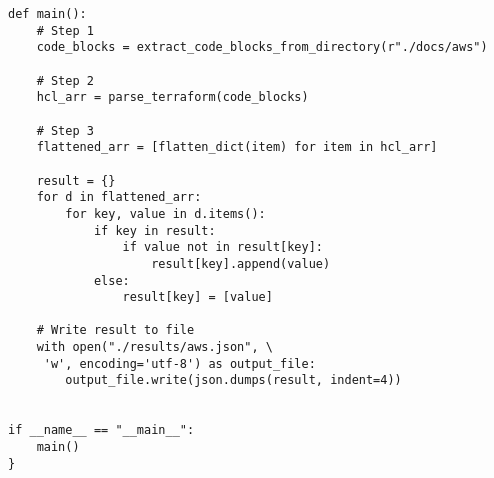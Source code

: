 \begin{verbatim}
def main():
    # Step 1
    code_blocks = extract_code_blocks_from_directory(r"./docs/aws")

    # Step 2
    hcl_arr = parse_terraform(code_blocks)

    # Step 3
    flattened_arr = [flatten_dict(item) for item in hcl_arr]

    result = {}
    for d in flattened_arr:
        for key, value in d.items():
            if key in result:
                if value not in result[key]:
                    result[key].append(value)
            else:
                result[key] = [value]

    # Write result to file
    with open("./results/aws.json", \
     'w', encoding='utf-8') as output_file:
        output_file.write(json.dumps(result, indent=4))


if __name__ == "__main__":
    main()
}
\end{verbatim}
